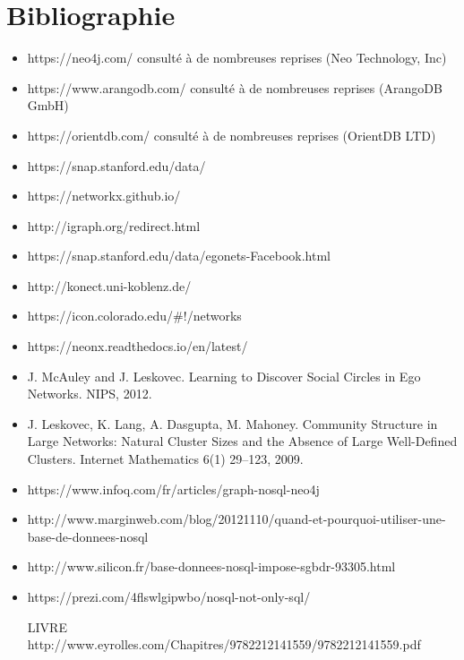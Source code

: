 \documentclass[a4paper,12pt,twoside, fleqn]{report}
\begin{document}
\chapter{Bibliographie}
\begin{itemize}
\item https://neo4j.com/ consulté à de nombreuses reprises (Neo Technology, Inc)
\item https://www.arangodb.com/ consulté à de nombreuses reprises (ArangoDB GmbH)
\item https://orientdb.com/ consulté à de nombreuses reprises (OrientDB LTD)
\item https://snap.stanford.edu/data/
\item https://networkx.github.io/
\item http://igraph.org/redirect.html
\item https://snap.stanford.edu/data/egonets-Facebook.html
\item http://konect.uni-koblenz.de/
\item https://icon.colorado.edu/\#!/networks
\item https://neonx.readthedocs.io/en/latest/
\item J. McAuley and J. Leskovec. Learning to Discover Social Circles in Ego Networks. NIPS, 2012.
\item J. Leskovec, K. Lang, A. Dasgupta, M. Mahoney. Community Structure in Large Networks: Natural Cluster Sizes and the Absence of Large Well-Defined Clusters. Internet Mathematics 6(1) 29--123, 2009.
\item https://www.infoq.com/fr/articles/graph-nosql-neo4j
\item http://www.marginweb.com/blog/20121110/quand-et-pourquoi-utiliser-une-base-de-donnees-nosql
\item http://www.silicon.fr/base-donnees-nosql-impose-sgbdr-93305.html
\item https://prezi.com/4flswlgipwbo/nosql-not-only-sql/
\item [LIVRE] http://www.eyrolles.com/Chapitres/9782212141559/9782212141559.pdf
\end{itemize}
\end{document}
